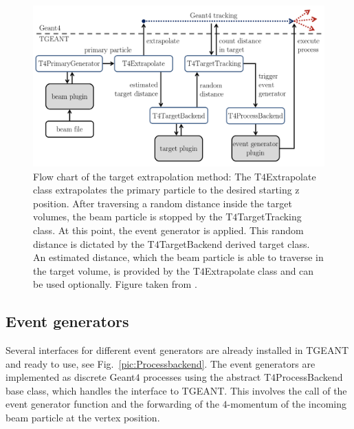\begin{figure}[!h]
  \centering
	\includegraphics[scale=0.5]{./gfx/Targetextrap.png}
	\caption{Flow chart of the target extrapolation method: The T$4$Extrapolate class extrapolates the primary particle to the desired starting z position. After traversing a random distance inside the target volumes, the beam particle is stopped by the T$4$TargetTracking class. At this point, the event generator is applied. This random distance is dictated by the T$4$TargetBackend derived target class. An estimated distance, which the beam particle is able to traverse in the target volume, is provided by the T$4$Extrapolate class and can be used optionally. Figure taken from \cite{Tobias}.}
	\label{pic:Targetextrap}
\end{figure}

\subsection{Event generators}

Several interfaces for different event generators are already installed in TGEANT and ready to use, see Fig.~\ref{pic:Processbackend}. The event generators are implemented as discrete Geant$4$ processes using the abstract T$4$ProcessBackend base class, which handles the interface to TGEANT. This involves the call of the event generator function and the forwarding of the $4$-momentum of the incoming beam particle at the vertex position.

